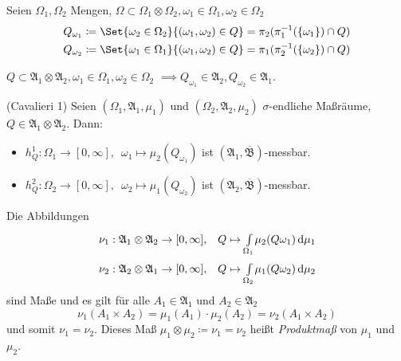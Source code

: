 \documentclass{cheat-sheet}
\newcommand{\Alg}{\mathfrak{A}} %
\newcommand{\Bor}{\mathfrak{B}} %
\theoremstyle{definition}
\begin{document}
\begin{nota}
  Seien $\Omega_1, \Omega_2$ Mengen, $\Omega \subset \Omega_1 \otimes \Omega_2, \omega_1 \in \Omega_1, \omega_2 \in \Omega_2$
  \begin{align*}
    Q_{\omega_1} &\coloneqq \Set{ \omega_2 \in \Omega_2 }{ (\omega_1, \omega_2) \in Q } = \pi_2(\pi_1^{-1}(\{ \omega_1 \}) \cap Q)\\
    Q_{\omega_2} &\coloneqq \Set{ \omega_1 \in \Omega_1 }{ (\omega_1, \omega_2) \in Q } = \pi_1(\pi_2^{-1}(\{ \omega_2 \}) \cap Q)
  \end{align*}
\end{nota}

\begin{satz} %
  $Q \subset \Alg_1 \otimes \Alg_2, \omega_1 \in \Omega_1, \omega_2 \in \Omega_2$
  $\implies Q_{\omega_1} \in \Alg_2, Q_{\omega_2} \in \Alg_1$.
\end{satz}

\begin{satz}(Cavalieri 1) %
  Seien $(\Omega_1, \Alg_1, \mu_1)$ und $(\Omega_2, \Alg_2, \mu_2)$ $\sigma$-endliche Maßräume, $Q \in \Alg_1 \otimes \Alg_2$. Dann:
  \begin{itemize}
    \item $h_Q^1 : \Omega_1 \to [0, \infty], \enspace \omega_1 \mapsto \mu_2(Q_{\omega_1})$ \enspace ist $(\Alg_1, \overline{\Bor})$-messbar.
    \item $h_Q^2 : \Omega_2 \to [0, \infty], \enspace \omega_2 \mapsto \mu_1(Q_{\omega_2})$ \enspace ist $(\Alg_2, \overline{\Bor})$-messbar.
  \end{itemize}
\end{satz}

\begin{satz}
  Die Abbildungen
  \begin{align*}
    \nu_1 : \Alg_1 \otimes \Alg_2 \to [0, \infty], \quad & Q \mapsto \Int{\Omega_1}{}{\mu_2(Q \omega_1)}{\mu_1} \\
    \nu_2 : \Alg_2 \otimes \Alg_1 \to [0, \infty], \quad & Q \mapsto \Int{\Omega_2}{}{\mu_1(Q \omega_2)}{\mu_2}
  \end{align*}
  sind Maße und es gilt für alle $A_1 \in \Alg_1$ und $A_2 \in \Alg_2$
  \[ \nu_1(A_1 \times A_2) = \mu_1(A_1) \cdot \mu_2(A_2) = \nu_2(A_1 \times A_2) \]
  und somit $\nu_1 = \nu_2$. Dieses Maß $\mu_1 \otimes \mu_2 \coloneqq \nu_1 = \nu_2$ heißt \emph{Produktmaß} von $\mu_1$ und $\mu_2$.
\end{satz}
\end{document}
